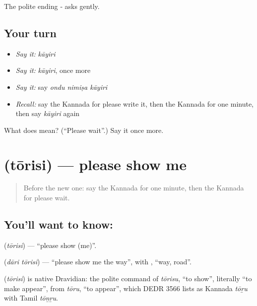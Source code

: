 \begin{grammarlens}[title={What you've built}]
The polite ending ‑ asks gently.
\end{grammarlens}

\subsection*{Your turn}
\begin{itemize}
\raggedright
  \item \emph{Say it:} \emph{kāyiri}
  \item \emph{Say it:} \emph{kāyiri}, once more
  \item \emph{Say it:} say \emph{ondu nimiṣa kāyiri}
  \item \emph{Recall:} say the Kannada for please write it, then the Kannada for one minute, then say \emph{kāyiri} again
\end{itemize}

\begin{tcolorbox}[breakable,colback=teal!4,colframe=teal!35!black,title={Before you move on}]
What does  mean? (\textquotedblleft{}Please wait\textquotedblright{}.) Say it once more.
\end{tcolorbox}
\section[\texorpdfstring{\kn{ತೋರಿಸಿ} (tōrisi)}{ತೋರಿಸಿ (tōrisi)}]{ (tōrisi) — please show me}

\label{lesson:KA-C86-show}



\begin{quote}
Before the new one: say the Kannada for one minute, then the Kannada for please wait.
\end{quote}

\subsection*{You'll want to know: }
\textbf{} (\emph{tōrisi}) — \textquotedblleft{}please show (me)\textquotedblright{}.

\textbf{ } (\emph{dāri tōrisi}) — \textquotedblleft{}please show me the way\textquotedblright{}, with \textbf{}, \textquotedblleft{}way, road\textquotedblright{}.

\begin{cousinweb}
\textbf{} (\emph{tōrisi}) is native Dravidian: the polite command of \emph{tōrisu}, \textquotedblleft{}to show\textquotedblright{}, literally \textquotedblleft{}to make appear\textquotedblright{}, from \emph{tōru}, \textquotedblleft{}to appear\textquotedblright{}, which DEDR 3566 lists as Kannada \emph{tōṟu} with Tamil \emph{tōṉṟu}.
\end{cousinweb}

